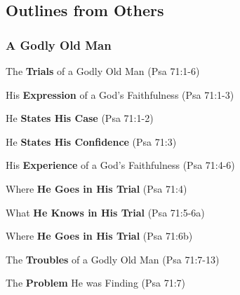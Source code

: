\subsection{Outlines from Others}

\subsubsection{A Godly Old Man}


\begin{compactenum}[I.][7]
    \item The \textbf{Trials} of a Godly Old Man (Psa 71:1-6)
    \begin{compactenum}[A.]
    		\item His \textbf{Expression} of a God's Faithfulness (Psa 71:1-3)
		\begin{compactenum}[1.]
    			\item He \textbf{States His Case}  (Psa 71:1-2)
    			\item He \textbf{States His Confidence}  (Psa 71:3)
		\end{compactenum}
    		\item His \textbf{Experience} of a God's Faithfulness (Psa 71:4-6)
		\begin{compactenum}[1.]
    			\item Where \textbf{He Goes in His Trial}  (Psa 71:4)
    			\item What \textbf{He Knows in His Trial}  (Psa 71:5-6a)
    			\item Where \textbf{He Goes in His Trial}  (Psa 71:6b)
		\end{compactenum}
    \end{compactenum}
    \item The \textbf{Troubles} of a Godly Old Man (Psa 71:7-13)
    \begin{compactenum}[A.]
    		\item The \textbf{Problem} He was Finding (Psa 71:7)

\end{compactenum}
\end{compactenum}
